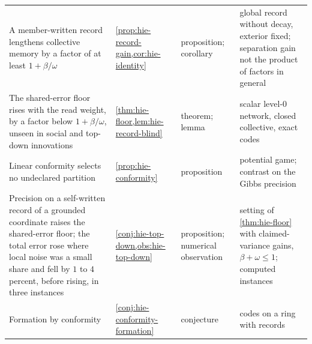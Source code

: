 \begin{longtable}{@{}>{\raggedright\arraybackslash}p{}>{\raggedright\arraybackslash}p{}>{\raggedright\arraybackslash}p{}>{\raggedright\arraybackslash}p{}@{}}
A member-written record lengthens collective memory by a factor of at least $1+\beta/\omega$ & \cref{prop:hie-record-gain,cor:hie-identity} & proposition; corollary & global record without decay, exterior fixed; separation gain not the product of factors in general\\
The shared-error floor rises with the read weight, by a factor below $1+\beta/\omega$, unseen in social and top-down innovations & \cref{thm:hie-floor,lem:hie-record-blind} & theorem; lemma & scalar level-0 network, closed collective, exact codes\\
Linear conformity selects no undeclared partition & \cref{prop:hie-conformity} & proposition & potential game; contrast on the Gibbs precision\\
Precision on a self-written record of a grounded coordinate raises the shared-error floor; the total error rose where local noise was a small share and fell by $1$ to $4$ percent, before rising, in three instances & \cref{conj:hie-top-down,obs:hie-top-down} & proposition; numerical observation & setting of \cref{thm:hie-floor} with claimed-variance gains, $\beta+\omega\le1$; computed instances\\
Formation by conformity & \cref{conj:hie-conformity-formation} & conjecture & codes on a ring with records\\
\end{longtable}
\endgroup

